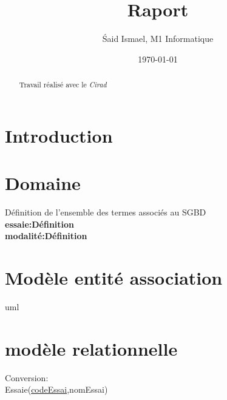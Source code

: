 \documentclass{article}
\title{Raport}
\author{\'Said Ismael, M1 Informatique}
\date{\today}
\begin{document}
\maketitle %


\begin{abstract}
  Travail réalisé avec le \textit{Cirad}~\cite{coursera}
\end{abstract}


\section{Introduction}
\section{Domaine}
Définition de l'ensemble des termes associés au SGBD \\ 
\textbf{essaie:Définition}
\\\textbf{modalité:Définition}
\section{Modèle entité association}
uml 

\section{modèle relationnelle}
Conversion:\\
Essaie(\underline{codeEssai},nomEssai) 







\end{document}
